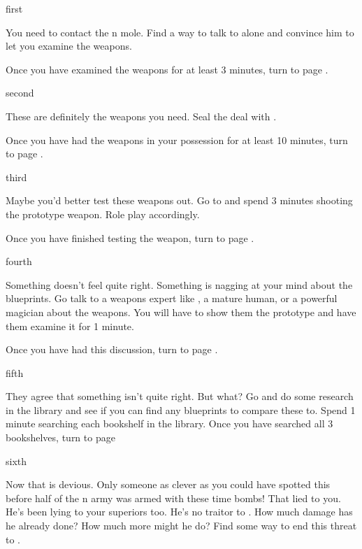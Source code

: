 \documentclass[greennotebook]{NeptuneBall}
\begin{document}

\startnotebook{\nIllicitWeapons{}}

\begin{page}{first}

You need to contact the \pAtlantis{}n mole. Find a way to talk to \cGeneral{} alone and convince him to let you examine the weapons.

Once you have examined the weapons for at least 3 minutes, turn to page .

\end{page}

\begin{page}{second}

These are definitely the weapons you need. Seal the deal with \cGeneral{}. 

Once you have had the weapons in your possession for at least 10 minutes, turn to page .

\end{page}

\begin{page}{third}

Maybe you'd better test these weapons out. Go to \sGardens{} and spend 3 minutes shooting the prototype weapon. Role play accordingly.

Once you have finished testing the weapon, turn to page .

\end{page}

\begin{page}{fourth}

Something doesn't feel quite right. Something is nagging at your mind about the blueprints. Go talk to a weapons expert like \cPrince{}, a mature human, or a powerful magician about the weapons. You will have to show them the prototype and have them examine it for 1 minute. 

Once you have had this discussion, turn to page .

\end{page}

\begin{page}{fifth}

They agree that something isn't quite right. But what? Go and do some research in the library and see if you can find any blueprints to compare these to. Spend 1 minute searching each bookshelf in the library. Once you have searched all 3 bookshelves, turn to page 


\end{page}

\begin{page}{sixth}

Now that is devious. Only someone as clever as you could have spotted this before half of the \pPacifica{}n army was armed with these time bombs! That \cGeneral{} lied to you. He's been lying to your superiors too. He's no traitor to \pAtlantis{}. How much damage has he already done? How much more might he do? Find some way to end this threat to \pPacifica{}.

\end{page}

\endnotebook
\end{document}
